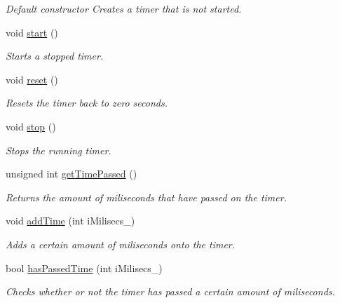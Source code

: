 \begin{CompactItemize}
\begin{CompactList}\small\item\em Default constructor Creates a timer that is not started. \item\end{CompactList}\item 
void \hyperlink{class_timer_3a8b5272198d029779dc9302a54305a8}{start} ()
\begin{CompactList}\small\item\em Starts a stopped timer. \item\end{CompactList}\item 
void \hyperlink{class_timer_9020542d73357a4eef512eefaf57524b}{reset} ()
\begin{CompactList}\small\item\em Resets the timer back to zero seconds. \item\end{CompactList}\item 
void \hyperlink{class_timer_63f0eb44b27402196590a03781515dba}{stop} ()
\begin{CompactList}\small\item\em Stops the running timer. \item\end{CompactList}\item 
unsigned int \hyperlink{class_timer_990f0a0980e5e9dc46f7743d378cce9f}{getTimePassed} ()
\begin{CompactList}\small\item\em Returns the amount of miliseconds that have passed on the timer. \item\end{CompactList}\item 
void \hyperlink{class_timer_a79670d8a0acb6167254966c763a747c}{addTime} (int iMilisecs\_\-)
\begin{CompactList}\small\item\em Adds a certain amount of miliseconds onto the timer. \item\end{CompactList}\item 
bool \hyperlink{class_timer_f4e764bae73f87c413e76ec640a8bdd2}{hasPassedTime} (int iMilisecs\_\-)
\begin{CompactList}\small\item\em Checks whether or not the timer has passed a certain amount of miliseconds. \item\end{CompactList}\end{CompactItemize}


